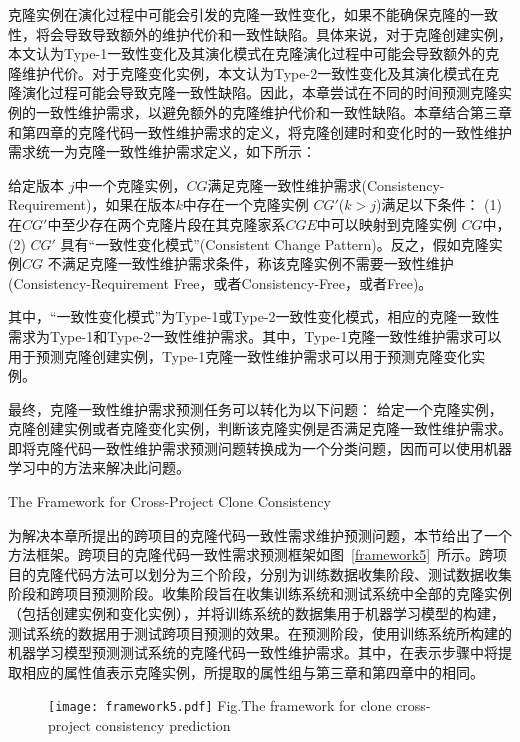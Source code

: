 克隆实例在演化过程中可能会引发的克隆一致性变化，如果不能确保克隆的一致性，将会导致导致额外的维护代价和一致性缺陷。具体来说，对于克隆创建实例，本文认为Type-1一致性变化及其演化模式在克隆演化过程中可能会导致额外的克隆维护代价。对于克隆变化实例，本文认为Type-2一致性变化及其演化模式在克隆演化过程可能会导致克隆一致性缺陷。因此，本章尝试在不同的时间预测克隆实例的一致性维护需求，以避免额外的克隆维护代价和一致性缺陷。本章结合第三章和第四章的克隆代码一致性维护需求的定义，将克隆创建时和变化时的一致性维护需求统一为克隆一致性维护需求定义，如下所示：\\

\begin{definition}[克隆一致性维护需求] 
 \label{def-requirement}
给定版本 $j$中一个克隆实例，$CG$满足克隆一致性维护需求(Consistency-Requirement)，如果在版本$k$中存在一个克隆实例 $CG'$($k>j$)满足以下条件： (1) 在$CG'$中至少存在两个克隆片段在其克隆家系$CGE$中可以映射到克隆实例 $CG$中， (2) $CG'$ 具有“一致性变化模式”(Consistent Change Pattern)。反之，假如克隆实例$CG$ 不满足克隆一致性维护需求条件，称该克隆实例不需要一致性维护(Consistency-Requirement Free，或者Consistency-Free，或者Free)。
\end{definition}

其中，“一致性变化模式”为Type-1或Type-2一致性变化模式，相应的克隆一致性需求为Type-1和Type-2一致性维护需求。其中，Type-1克隆一致性维护需求可以用于预测克隆创建实例，Type-1克隆一致性维护需求可以用于预测克隆变化实例。

最终，克隆一致性维护需求预测任务可以转化为以下问题：
给定一个克隆实例，克隆创建实例或者克隆变化实例，判断该克隆实例是否满足克隆一致性维护需求。即将克隆代码一致性维护需求预测问题转换成为一个分类问题，因而可以使用机器学习中的方法来解决此问题。

{The Framework for Cross-Project Clone Consistency}

为解决本章所提出的跨项目的克隆代码一致性需求维护预测问题，本节给出了一个方法框架。跨项目的克隆代码一致性需求预测框架如图~\ref{framework5}~所示。跨项目的克隆代码方法可以划分为三个阶段，分别为训练数据收集阶段、测试数据收集阶段和跨项目预测阶段。收集阶段旨在收集训练系统和测试系统中全部的克隆实例（包括创建实例和变化实例），并将训练系统的数据集用于机器学习模型的构建，测试系统的数据用于测试跨项目预测的效果。在预测阶段，使用训练系统所构建的机器学习模型预测测试系统的克隆代码一致性维护需求。其中，在表示步骤中将提取相应的属性值表示克隆实例，所提取的属性组与第三章和第四章中的相同。

\begin{figure}[htbp]
\centering
\texttt{[image: framework5.pdf]}
{Fig.$\!$}{The framework for clone cross-project consistency prediction}
\vspace{-1em}
\end{figure}


